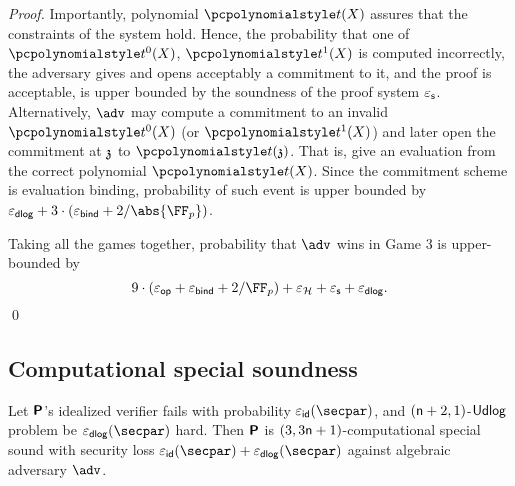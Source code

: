 {\begin{proof}
  Importantly, polynomial $\p{t}(X)$ assures that the constraints of the system
  hold. Hence, the probability that one of $\p{t^0}(X)$, $\p{t^1}(X)$ is computed
  incorrectly, the adversary gives and opens acceptably a commitment to it, and
  the proof is acceptable, is upper bounded by the soundness of the proof system
  $\varepsilon_{\mathsf{s}}$. Alternatively, $\adv$ may compute a commitment to an invalid
  $\p{t^0}(X)$ (or $\p{t^1}(X)$) and later open the commitment at $\mathfrak{z}$ to
  $\p{t}(\chz)$. That is, give an evaluation from the correct polynomial
  $\p{t}(X)$. Since the commitment scheme is evaluation binding, probability of
  such event is upper bounded by $\epsdlog + 3 \cdot (\epsbinding + \infrac{2}{\abs{\FF_p}})$.

   Taking all the games together, probability that $\adv$ wins
  in Game 3 is upper-bounded by
  \[
    9 \cdot (\epsop + \epsbind + \infrac{2}{\FF_p}) + \epsro + \epss + \epsdlog.
  \]
  \qed
\end{proof}
}

\subsection{Computational special soundness}
\begin{lemma}
	\label{lem:plonkprot_ss}
	Let $\bm{\mathsf{P}}$'s idealized verifier fails with probability $\epsid (\secpar)$, and
	$(\mathsf{n} + 2, 1)$-$\mathsf{Udlog}$ problem be $\epsdlog (\secpar)$ hard. Then $\bm{\mathsf{P}}$ is
	$(3, 3 \mathsf{n} + 1)$-computational special sound with security loss $\epsid (\secpar) + \epsdlog (\secpar)$ against algebraic
	adversary $\adv$.
\end{lemma}

